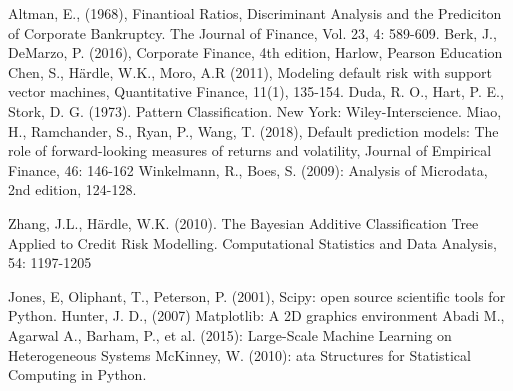 \documentclass{article}
\begin{document}
\begin{thebibliography}{9}
  Altman, E., (1968), Finantioal Ratios, Discriminant Analysis and the Prediciton of Corporate Bankruptcy. The Journal of Finance, Vol. 23, 4: 589-609.
  Berk, J., DeMarzo, P. (2016), Corporate Finance, 4th edition, Harlow, Pearson Education
  Chen, S., H{\"a}rdle, W.K., Moro, A.R (2011), Modeling default risk with support vector machines,  Quantitative Finance, 11(1), 135-154.
Duda, R. O., Hart, P. E., Stork, D. G. (1973). Pattern Classification. New York: Wiley-Interscience.
  Miao, H., Ramchander, S., Ryan, P., Wang, T. (2018), Default prediction models: The role of forward-looking      measures of returns and volatility, Journal of Empirical Finance, 46: 146-162
  Winkelmann, R., Boes, S. (2009): Analysis of Microdata, 2nd edition, 124-128.

  Zhang, J.L., H{\"a}rdle, W.K. (2010). The Bayesian Additive Classification Tree Applied to Credit Risk Modelling. Computational Statistics and Data Analysis, 54: 1197-1205

  Jones, E, Oliphant, T., Peterson, P. (2001), Scipy: open source scientific tools for Python.
  Hunter, J. D., (2007) Matplotlib: A 2D graphics environment
Abadi M., Agarwal A., Barham, P., et al. (2015): Large-Scale Machine Learning on Heterogeneous Systems
  McKinney, W. (2010): ata Structures for Statistical Computing in Python.
\end{thebibliography}
\end{document}
